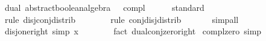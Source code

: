 \begin{isabellebody}
%
\isamarkuptrue%
%
\endisatagdocument
{\isafolddocument}%
%
\isadelimdocument
%
\endisadelimdocument
{}\isamarkupfalse%
\isanewline
{}\isanewline
\isanewline
{}\isamarkupfalse%
\ dual{\isacharcolon}{\kern0pt}\ abstract{\isacharunderscore}{\kern0pt}boolean{\isacharunderscore}{\kern0pt}algebra\ {\isacartoucheopen}{\isacharparenleft}{\kern0pt}\isactrlbold {\isasymsqunion}{\isacharparenright}{\kern0pt}{\isacartoucheclose}\ {\isacartoucheopen}{\isacharparenleft}{\kern0pt}\isactrlbold {\isasymsqinter}{\isacharparenright}{\kern0pt}{\isacartoucheclose}\ compl\ {\isacartoucheopen}\ {\isacartoucheopen}\isanewline
%
\isadelimproof
\ \ %
\endisadelimproof
%
\isatagproof
{}\isamarkupfalse%
\ standard\isanewline
\ \ \ \ \ \ \ \isamarkupfalse%
\ {\isacharparenleft}{\kern0pt}rule\ disj{\isacharunderscore}{\kern0pt}conj{\isacharunderscore}{\kern0pt}distrib{\isacharparenright}{\kern0pt}\isanewline
\ \ \ \ \ \ \isamarkupfalse%
\ {\isacharparenleft}{\kern0pt}rule\ conj{\isacharunderscore}{\kern0pt}disj{\isacharunderscore}{\kern0pt}distrib{\isacharparenright}{\kern0pt}\isanewline
\ \ \ \ \ \isamarkupfalse%
\ simp{\isacharunderscore}{\kern0pt}all\isanewline
\ \ \isamarkupfalse%
%
\endisatagproof
{\isafoldproof}%
%
\isadelimproof
\isanewline
%
\endisadelimproof
\isanewline
{}\isamarkupfalse%
\ disj{\isacharunderscore}{\kern0pt}one{\isacharunderscore}{\kern0pt}right\ {\isacharbrackleft}{\kern0pt}simp{\isacharbrackright}{\kern0pt}{\isacharcolon}{\kern0pt}\ {\isachardoublequoteopen}x\ \isactrlbold {\isasymsqunion}\ \ {\isacharequal}{\kern0pt}\ \isanewline
%
\isadelimproof
\ \ %
\endisadelimproof
%
\isatagproof
{}\isamarkupfalse%
\ {\isacharparenleft}{\kern0pt}fact\ dual{\isachardot}{\kern0pt}conj{\isacharunderscore}{\kern0pt}zero{\isacharunderscore}{\kern0pt}right{\isacharparenright}{\kern0pt}%
\endisatagproof
{\isafoldproof}%
%
\isadelimproof
\isanewline
%
\endisadelimproof
\isanewline
{}\isamarkupfalse%
\ compl{\isacharunderscore}{\kern0pt}zero\ {\isacharbrackleft}{\kern0pt}simp{\isacharbrackright}{\kern0pt}{\isacharcolon}{\kern0pt}\ {\isachardoublequoteopen}\isactrlbold {\isacharminus}{\kern0pt}\ \ {\isacharequal}{\kern0pt}\ \isanewline

\end{isabellebody}
